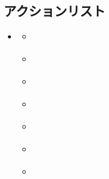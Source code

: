 \documentclass[letterpaper,10pt,dvipdfmx]{sphinxmanual}
\begin{document}
\subsection{アクションリスト}
\label{\detokenize{auto/actionlist:actionlist-act}}\label{\detokenize{auto/actionlist:act-act}}\label{\detokenize{auto/actionlist:id1}}\label{\detokenize{auto/actionlist::doc}}
\begin{sphinxShadowBox}
\begin{itemize}
\item {} 
\sphinxAtStartPar
{}\label{\detokenize{auto/actionlist:id58}}{\hyperref[\detokenize{auto/actionlist:id3}]{}}
\begin{itemize}
\item {} 
\sphinxAtStartPar
{}\label{\detokenize{auto/actionlist:id59}}{\hyperref[\detokenize{auto/actionlist:act-end}]{}}

\item {} 
\sphinxAtStartPar
{}\label{\detokenize{auto/actionlist:id60}}{\hyperref[\detokenize{auto/actionlist:act-charge}]{}}

\item {} 
\sphinxAtStartPar
{}\label{\detokenize{auto/actionlist:id61}}{\hyperref[\detokenize{auto/actionlist:act-draw}]{}}

\item {} 
\sphinxAtStartPar
{}\label{\detokenize{auto/actionlist:id62}}{\hyperref[\detokenize{auto/actionlist:act-attack}]{}}

\item {} 
\sphinxAtStartPar
{}\label{\detokenize{auto/actionlist:id63}}{\hyperref[\detokenize{auto/actionlist:act-block}]{}}

\item {} 
\sphinxAtStartPar
{}\label{\detokenize{auto/actionlist:id64}}{\hyperref[\detokenize{auto/actionlist:act-damagejudge}]{}}

\item {} 
\sphinxAtStartPar
{}\label{\detokenize{auto/actionlist:id65}}{\hyperref[\detokenize{auto/actionlist:act-nextgeneration}]{}}

\end{itemize}


\end{itemize}
\end{sphinxShadowBox}
\end{document}
